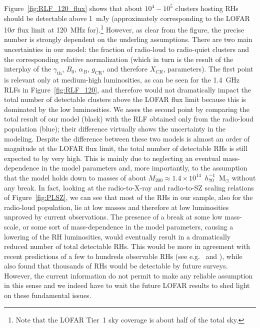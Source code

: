 \documentclass[traditabstract]{aa}
\newcommand{\rmn}{\mathrm}
\begin{document}
Figure~\ref{fig:RLF_120_flux} shows that about $10^4-10^5$ clusters hosting RHs should be detectable above 1~mJy (approximately corresponding to the LOFAR 10$\sigma$ flux limit at 120~MHz for).\footnote[16]{Note that the LOFAR Tier~1 sky coverage is about half of the total sky.} However, as clear from the figure, the precise number is strongly dependent on the underling assumptions. There are two main uncertainties in our model: the fraction of radio-loud to radio-quiet clusters and the corresponding relative normalization (which in turn is the result of the interplay of the $\gamma_{\rmn{th}}$, $B_{0}$, $\alpha_{B}$, $g_{\rmn{CR}}$, and therefore $X_{CR}$, parameters). The first point is relevant only at medium-high luminosities, as can be seen for the 1.4~GHz RLFs in Figure~\ref{fig:RLF_120}, and therefore would not dramatically impact the total number of detectable clusters above the LOFAR flux limit because this is dominated by the low luminosities. We asses the second point by comparing the total result of our model (black) with the RLF obtained only from the radio-loud population (blue); their difference virtually shows the uncertainty in the modeling. Despite the difference between these two models is almost an order of magnitude at the LOFAR flux limit, the total number of detectable RHs is still expected to by very high. This is mainly due to neglecting an eventual mass-dependence in the model parameters and, more importantly, to the assumption that the model holds down to masses of about $M_{200}\approx1.4\times10^{14}$~$h_{70}^{-1}$~M$_{\odot}$ without any break. In fact, looking at the radio-to-X-ray and radio-to-SZ scaling relations of Figure~\ref{fig:PLSZ}, we can see that most of the RHs in our sample, also for the radio-loud population, lie at low masses and therefore at low luminosities unproved by current observations. The presence of a break at some low mass-scale, or some sort of mass-dependence in the model parameters, causing a lowering of the RH luminosities, would eventually result in a dramatically reduced number of total detectable RHs. This would be more in agreement with recent predictions of a few to hundreds observable RHs (see e.g.~\citealp{2010A&A...509A..68C} and \citealp{2011arXiv1110.2786S}), while \cite{2002A&A...396...83E} also found that thousands of RHs would be detectable by future surveys. However, the current information do not permit to make any reliable assumption in this sense and we indeed have to wait the future LOFAR results to shed light on these fundamental issues. 
\end{document}
